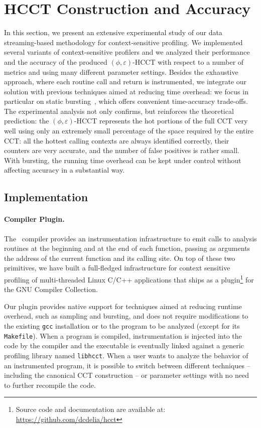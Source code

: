 
\section{HCCT Construction and Accuracy}
\label{ss:hcct-eval}

In this section, we present an extensive experimental study of our data streaming-based methodology for context-sensitive profiling. We implemented several variants of context-sensitive profilers and we analyzed their performance and the accuracy of the produced $(\phi,\varepsilon)$-HCCT with respect to a number of metrics and using many different parameter settings. Besides the exhaustive approach, where each routine call and return is instrumented, we integrate our solution with previous techniques aimed at reducing time overhead: we focus in particular on static bursting~\cite{Zhuang06}, which offers convenient time-accuracy trade-offs. The experimental analysis not only confirms, but reinforces the theoretical prediction: the $(\phi,\varepsilon)$-HCCT represents the hot portions of the full CCT very well using only an extremely small percentage of the space required by the entire CCT: all the hottest calling contexts are always identified correctly, their counters are very accurate, and the number of false positives is rather small. With bursting, the running time overhead can be kept under control without affecting accuracy in a substantial way.

\subsection{Implementation}
\label{ss:hcct-implementation}

\paragraph*{Compiler Plugin.} The \gcc\ compiler provides an instrumentation infrastructure to emit calls to analysis routines at the beginning and at the end of each function, passing as arguments the address of the current function and its calling site. On top of these two primitives, we have built a full-fledged infrastructure for context sensitive profiling of multi-threaded Linux C/C++ applications that ships as a plugin\footnote{Source code and documentation are available at: \url{https://github.com/dcdelia/hcct}} for the GNU Compiler Collection.

Our plugin provides native support for techniques aimed at reducing runtime overhead, such as sampling and bursting, and does not require modifications to the existing {\tt gcc} installation or to the program to be analyzed (except for its {\tt Makefile}). When a program is compiled, instrumentation is injected into the code by the compiler and the executable is eventually linked against a generic profiling library named {\tt libhcct}. When a user wants to analyze the behavior of an instrumented program, it is possible to switch between different techniques -- including the canonical CCT construction -- or parameter settings with no need to further recompile the code.

